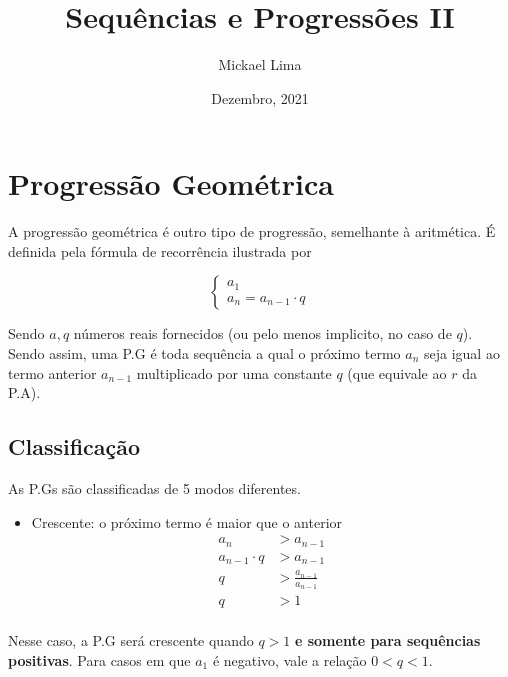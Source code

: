 \documentclass[11pt]{article}
\title{Sequências e Progressões II}
\author{Mickael Lima}
\date{Dezembro, 2021}
\begin{document}
\maketitle
\pagebreak
\tableofcontents
\pagebreak

\section{Progressão Geométrica}

A progressão geométrica é outro tipo de progressão, semelhante à aritmética. É definida pela fórmula de recorrência ilustrada por

\begin{equation*}
\begin{cases}
  a_{1} \\
  a_{n} = a_{n - 1} \cdot q
\end{cases}
\end{equation*}

Sendo $a, q$ números reais fornecidos (ou pelo menos implicito, no caso de $q$). Sendo assim, uma P.G é toda sequência a qual o próximo termo $a_{n}$ seja igual ao termo anterior $a_{n - 1}$ multiplicado por uma constante $q$ (que equivale ao $r$ da P.A).

\subsection{Classificação}

As P.Gs são classificadas de 5 modos diferentes.

\begin{tcolorbox}[colback=LightYellow]

\begin{itemize}
        \item Crescente: o próximo termo é maior que o anterior
        \begin{equation*}
        \begin{align*}
          a_{n} &> a_{n - 1} \\
          a_{n - 1} \cdot q &> a_{n - 1} \\
          q &> \frac{a_{n - 1}}{a_{n - 1}} \\
          q &> 1 \\
        \end{align*}
        \end{equation*}
\end{itemize}

Nesse caso, a P.G será crescente quando $q > 1$ \textbf{e somente para sequências positivas}. Para casos em que $a_{1}$ é negativo, vale a relação $0 < q < 1$.
\end{tcolorbox}
\end{document}
